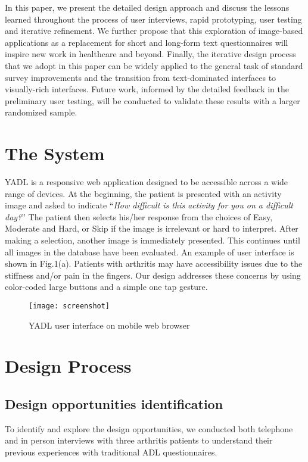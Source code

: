 \documentclass{sig-alternate-05-2015}
\begin{document}
In this paper, we present the detailed design approach and discuss the lessons learned throughout the process of user interviews, rapid prototyping, user testing and iterative refinement. We further propose that this exploration of image-based applications as a replacement for short and long-form text questionnaires will inspire new work in healthcare and beyond. Finally, the iterative design process that we adopt in this paper can be widely applied to the general task of standard survey improvements and the transition from text-dominated interfaces to visually-rich interfaces. Future work, informed by the detailed feedback in the preliminary user testing, will be conducted to validate these results with a larger randomized sample.
\vspace{-3mm}
\section{The System}

YADL is a responsive web application designed to be accessible across a wide range of devices. At the beginning, the patient is presented with an activity image and asked to indicate ``\textit{How difficult is this activity for you on a difficult day?}'' The patient then selects his/her response from the choices of Easy, Moderate and Hard, or Skip if the image is irrelevant or hard to interpret. After making a selection, another image is immediately presented. This continues until all images in the database have been evaluated. An example of user interface is shown in Fig.1(a). Patients with arthritis may have accessibility issues due to the stiffness and/or pain in the fingers. Our design addresses these concerns by using color-coded large buttons and a simple one tap gesture.

\begin{figure}
\centering
  \texttt{[image: screenshot]}
  \caption{YADL user interface on mobile web browser}
\label{fig:yadl}
\vspace{-4mm}
\end{figure}

\vspace{-3mm}
\section{Design Process}
\vspace{-1mm}
\subsection{Design opportunities identification}
To identify and explore the design opportunities, we conducted both telephone and in person interviews with three arthritis patients to understand their previous experiences with traditional ADL questionnaires. 
\end{document}
